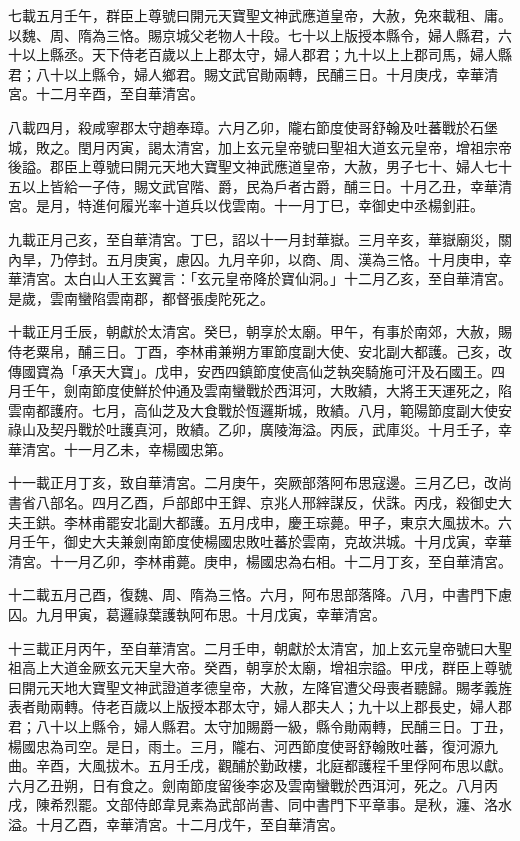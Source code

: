 \begin{pinyinscope}
 七載五月壬午，群臣上尊號曰開元天寶聖文神武應道皇帝，大赦，免來載租、庸。以魏、周、隋為三恪。賜京城父老物人十段。七十以上版授本縣令，婦人縣君，六十以上縣丞。天下侍老百歲以上上郡太守，婦人郡君；九十以上上郡司馬，婦人縣君；八十以上縣令，婦人鄉君。賜文武官勛兩轉，民酺三日。十月庚戌，幸華清宮。十二月辛酉，至自華清宮。



 八載四月，殺咸寧郡太守趙奉璋。六月乙卯，隴右節度使哥舒翰及吐蕃戰於石堡城，敗之。閏月丙寅，謁太清宮，加上玄元皇帝號曰聖祖大道玄元皇帝，增祖宗帝後謚。郡臣上尊號曰開元天地大寶聖文神武應道皇帝，大赦，男子七十、婦人七十五以上皆給一子侍，賜文武官階、爵，民為戶者古爵，酺三日。十月乙丑，幸華清宮。是月，特進何履光率十道兵以伐雲南。十一月丁巳，幸御史中丞楊釗莊。



 九載正月己亥，至自華清宮。丁巳，詔以十一月封華嶽。三月辛亥，華嶽廟災，關內旱，乃停封。五月庚寅，慮囚。九月辛卯，以商、周、漢為三恪。十月庚申，幸華清宮。太白山人王玄翼言：「玄元皇帝降於寶仙洞。」十二月乙亥，至自華清宮。是歲，雲南蠻陷雲南郡，都督張虔陀死之。



 十載正月壬辰，朝獻於太清宮。癸巳，朝享於太廟。甲午，有事於南郊，大赦，賜侍老粟帛，酺三日。丁酉，李林甫兼朔方軍節度副大使、安北副大都護。己亥，改傳國寶為「承天大寶」。戊申，安西四鎮節度使高仙芝執突騎施可汗及石國王。四月壬午，劍南節度使鮮於仲通及雲南蠻戰於西洱河，大敗績，大將王天運死之，陷雲南都護府。七月，高仙芝及大食戰於恆邏斯城，敗績。八月，範陽節度副大使安祿山及契丹戰於吐護真河，敗績。乙卯，廣陵海溢。丙辰，武庫災。十月壬子，幸華清宮。十一月乙未，幸楊國忠第。



 十一載正月丁亥，致自華清宮。二月庚午，突厥部落阿布思寇邊。三月乙巳，改尚書省八部名。四月乙酉，戶部郎中王銲、京兆人邢縡謀反，伏誅。丙戌，殺御史大夫王鉷。李林甫罷安北副大都護。五月戌申，慶王琮薨。甲子，東京大風拔木。六月壬午，御史大夫兼劍南節度使楊國忠敗吐蕃於雲南，克故洪城。十月戊寅，幸華清宮。十一月乙卯，李林甫薨。庚申，楊國忠為右相。十二月丁亥，至自華清宮。



 十二載五月己酉，復魏、周、隋為三恪。六月，阿布思部落降。八月，中書門下慮囚。九月甲寅，葛邏祿葉護執阿布思。十月戊寅，幸華清宮。



 十三載正月丙午，至自華清宮。二月壬申，朝獻於太清宮，加上玄元皇帝號曰大聖祖高上大道金厥玄元天皇大帝。癸酉，朝享於太廟，增祖宗謚。甲戌，群臣上尊號曰開元天地大寶聖文神武證道孝德皇帝，大赦，左降官遭父母喪者聽歸。賜孝義旌表者勛兩轉。侍老百歲以上版授本郡太守，婦人郡夫人；九十以上郡長史，婦人郡君；八十以上縣令，婦人縣君。太守加賜爵一級，縣令勛兩轉，民酺三日。丁丑，楊國忠為司空。是日，雨土。三月，隴右、河西節度使哥舒翰敗吐蕃，復河源九曲。辛酉，大風拔木。五月壬戌，觀酺於勤政樓，北庭都護程千里俘阿布思以獻。六月乙丑朔，日有食之。劍南節度留後李宓及雲南蠻戰於西洱河，死之。八月丙戌，陳希烈罷。文部侍郎韋見素為武部尚書、同中書門下平章事。是秋，瀍、洛水溢。十月乙酉，幸華清宮。十二月戊午，至自華清宮。




\end{pinyinscope}
